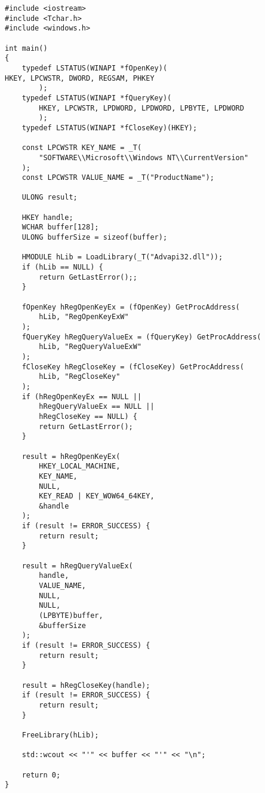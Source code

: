 \begin{lstlisting}[caption={Example code that uses run-time dynamically linked function calls.}, label={listing:run-time dynamic linking code}, captionpos=b]
#include <iostream>
#include <Tchar.h>
#include <windows.h>

int main()
{
    typedef LSTATUS(WINAPI *fOpenKey)(
HKEY, LPCWSTR, DWORD, REGSAM, PHKEY
        );
    typedef LSTATUS(WINAPI *fQueryKey)(
        HKEY, LPCWSTR, LPDWORD, LPDWORD, LPBYTE, LPDWORD
        );
    typedef LSTATUS(WINAPI *fCloseKey)(HKEY);

    const LPCWSTR KEY_NAME = _T(
        "SOFTWARE\\Microsoft\\Windows NT\\CurrentVersion"
    );
    const LPCWSTR VALUE_NAME = _T("ProductName");

    ULONG result;

    HKEY handle;
    WCHAR buffer[128];
    ULONG bufferSize = sizeof(buffer);

    HMODULE hLib = LoadLibrary(_T("Advapi32.dll"));
    if (hLib == NULL) {
        return GetLastError();;
    }

    fOpenKey hRegOpenKeyEx = (fOpenKey) GetProcAddress(
        hLib, "RegOpenKeyExW"
    );
    fQueryKey hRegQueryValueEx = (fQueryKey) GetProcAddress(
        hLib, "RegQueryValueExW"
    );
    fCloseKey hRegCloseKey = (fCloseKey) GetProcAddress(
        hLib, "RegCloseKey"
    );
    if (hRegOpenKeyEx == NULL ||
        hRegQueryValueEx == NULL ||
        hRegCloseKey == NULL) {
        return GetLastError();
    }

    result = hRegOpenKeyEx(
        HKEY_LOCAL_MACHINE,
        KEY_NAME,
        NULL,
        KEY_READ | KEY_WOW64_64KEY,
        &handle
    );
    if (result != ERROR_SUCCESS) {
        return result;
    }

    result = hRegQueryValueEx(
        handle,
        VALUE_NAME,
        NULL,
        NULL,
        (LPBYTE)buffer,
        &bufferSize
    );
    if (result != ERROR_SUCCESS) {
        return result;
    }

    result = hRegCloseKey(handle);
    if (result != ERROR_SUCCESS) {
        return result;
    }

    FreeLibrary(hLib);

    std::wcout << "'" << buffer << "'" << "\n";

    return 0;
}
    \end{lstlisting}
